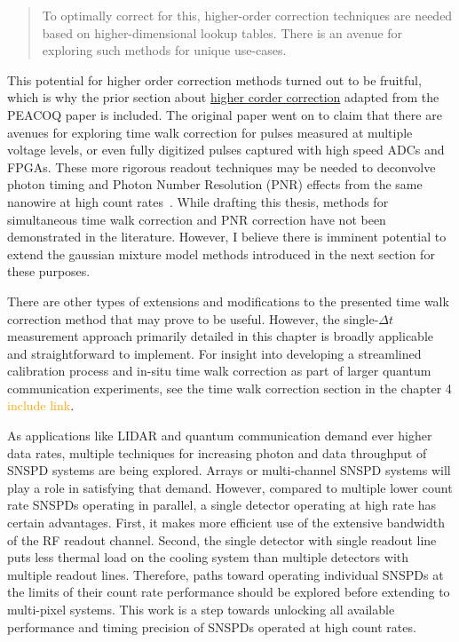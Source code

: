 \documentclass[11pt]{caltech_thesis} %
\begin{document}
\begin{quote}
To optimally correct for this, higher-order correction techniques are needed based on higher-dimensional lookup tables. There is an avenue for exploring such methods for unique use-cases. \autocite{Mueller2023}
\end{quote}

This potential for higher order correction methods turned out to be fruitful, which is why the prior section about \href{section_05_peacoq_2nd_order.md\#second-order-calibration}{higher corder correction} adapted from the PEACOQ paper \autocite{Craiciu23} is included. The original paper went on to claim that there are avenues for exploring time walk correction for pulses measured at multiple voltage levels, or even fully digitized pulses captured with high speed ADCs and FPGAs. These more rigorous readout techniques may be needed to deconvolve photon timing and Photon Number Resolution (PNR) effects from the same nanowire at high count rates~\autocite{Hao2021}. While drafting this thesis, methods for simultaneous time walk correction and PNR correction have not been demonstrated in the literature. However, I believe there is imminent potential to extend the gaussian mixture model methods introduced in the next section for these purposes.

There are other types of extensions and modifications to the presented time walk correction method that may prove to be useful. However, the single-$\Delta t$ measurement approach primarily detailed in this chapter is broadly applicable and straightforward to implement. For insight into developing a streamlined calibration process and in-situ time walk correction as part of larger quantum communication experiments, see the time walk correction section in the chapter 4 \textcolor{orange}{include link}.

As applications like LIDAR and quantum communication demand ever higher data rates, multiple techniques for increasing photon and data throughput of SNSPD systems are being explored. Arrays or multi-channel SNSPD systems will play a role in satisfying that demand. However, compared to multiple lower count rate SNSPDs operating in parallel, a single detector operating at high rate has certain advantages. First, it makes more efficient use of the extensive bandwidth of the RF readout channel. Second, the single detector with single readout line puts less thermal load on the cooling system than multiple detectors with multiple readout lines. Therefore, paths toward operating individual SNSPDs at the limits of their count rate performance should be explored before extending to multi-pixel systems. This work is a step towards unlocking all available performance and timing precision of SNSPDs operated at high count rates.
\end{document}
